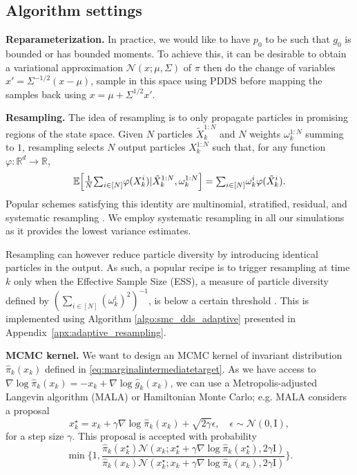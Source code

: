 \documentclass{article}
\theoremstyle{plain}
\theoremstyle{definition}
\theoremstyle{remark}
\begin{document}
\subsection{Algorithm settings}
\label{sec:algo_settings}
\textbf{Reparameterization.} In practice, we would like to have $p_0$ to be such that $g_0$ is bounded or has bounded moments. To achieve this, it can be desirable to obtain a variational approximation $\mathcal{N}(x;\mu,\Sigma)$ of $\pi$ then do the change of variables $x'=\Sigma^{-1/2}(x-\mu)$, sample in this space using PDDS before mapping the samples back using $x=\mu+\Sigma^{1/2}x'$. %

\textbf{Resampling.} The idea of resampling is to only propagate  particles in promising regions of the state space.
Given $N$ particles $\tilde X_k^{1:N}$ and $N$ weights $\omega_k^{1:N}$ summing to $1$, resampling selects $N$ output particles $X_k^{1:N}$ such that, for any function $\varphi: \mathbb R^d \to \mathbb R$,
\begin{equation*}
	\mathbb{E}\Bigl[  \tfrac 1N {\textstyle\sum}_{i\in[N]}\varphi(X_k^i) |\tilde X_k^{1:N}, \omega_k^{1:N}\Bigr] = {\textstyle\sum}_{i\in[N]} \omega_k^i \varphi(\tilde X_k^i).
\end{equation*}
Popular schemes satisfying this identity are multinomial, stratified, residual, and systematic resampling \citep{douc2005comparison}.
We employ systematic resampling in all our simulations as it provides the lowest variance estimates.

Resampling can however reduce particle diversity by introducing identical particles in the output. As such, a popular recipe is to trigger resampling at time $k$ only when the Effective Sample Size (ESS), a measure of particle diversity defined by $(\sum_{i\in[N]} (\omega ^i_k)^2)^{-1}$, is below a certain threshold \citep{Del-Moral:2012,dai2022invitation}. This is implemented using Algorithm \ref{algo:smc_dds_adaptive} presented in Appendix~\ref{apx:adaptive_resampling}.


\textbf{MCMC kernel.}
We want to design an MCMC kernel of invariant distribution $\hat \pi_k(x_k)$ defined in \eqref{eq:marginalintermediatetarget}. As we have access to $\nabla \log \hat\pi_k(x_k)=-x_k+ \nabla \log \hat{g}_k(x_k)$, we can use a Metropolis-adjusted Langevin algorithm (MALA) or Hamiltonian Monte Carlo; e.g. MALA considers a proposal
\begin{equation*}
	\textstyle
	x^\star_k=x_k+ \gamma \nabla \log \hat\pi_k(x_k)+ \sqrt{2\gamma} \epsilon,\quad \epsilon \sim \mathcal{N}(0,\mathrm{I}) ,
\end{equation*}
for a step size $\gamma$. This proposal is accepted with probability
\begin{equation*}
	\min\biggl\{1,\frac{\hat \pi_k(x_k^\star)\mathcal{N}(x_k;x^\star_k+\gamma \nabla \log \hat \pi_k(x^\star_k),2 \gamma \mathrm{I})}{\hat\pi_k(x_k)\mathcal{N}(x^\star_k;x_k+\gamma \nabla \log \hat\pi_k(x_k),2\gamma \mathrm{I})} \biggr\}.
\end{equation*}
\end{document}
